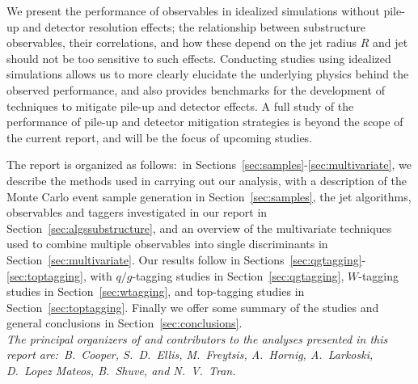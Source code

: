 We present the performance of observables in idealized simulations without pile-up and detector resolution effects;
the relationship between substructure observables, their correlations, and how these depend on the jet radius $R$ and jet \pt should not be too sensitive to such effects. Conducting  studies using idealized simulations allows us to more clearly elucidate the underlying physics behind the observed performance, and also provides benchmarks for the development of techniques to mitigate pile-up and detector effects. A full study of the performance of pile-up and detector mitigation strategies is beyond the scope of the current report, and will be the focus of upcoming studies.

The report is organized as follows:~in Sections~\ref{sec:samples}-\ref{sec:multivariate}, we describe the methods used in carrying out our analysis, with a description of the Monte Carlo event sample generation in Section~\ref{sec:samples}, the jet algorithms, observables and taggers investigated in our report in Section~\ref{sec:algssubstructure}, and an overview of the multivariate techniques used to combine multiple observables into single discriminants in Section~\ref{sec:multivariate}. Our results follow in Sections~\ref{sec:qgtagging}-\ref{sec:toptagging}, with $q/g$-tagging studies in Section~\ref{sec:qgtagging}, $W$-tagging studies in Section~\ref{sec:wtagging}, and top-tagging studies in Section~\ref{sec:toptagging}. Finally we offer some summary of the studies and general conclusions in Section~\ref{sec:conclusions}.\\


\emph{The principal organizers of and contributors to the analyses presented in this report are:~B.~Cooper, S.~D.~Ellis, M.~Freytsis, A.~Hornig, A.~Larkoski, D.~Lopez Mateos, B.~Shuve, and N.~V.~Tran.}
